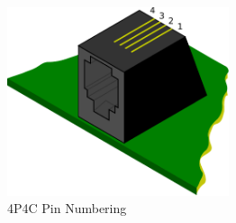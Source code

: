 \documentclass[a4paper,twocolumn]{article}
\begin{document}
\begin{figure}
  \begin{center}
    \includegraphics[width=6.5cm]{./images/4p4c.pdf}
  \end{center}
  \caption{\label{fig:4p4c-pin-num}4P4C Pin Numbering}
\end{figure}
\end{document}
